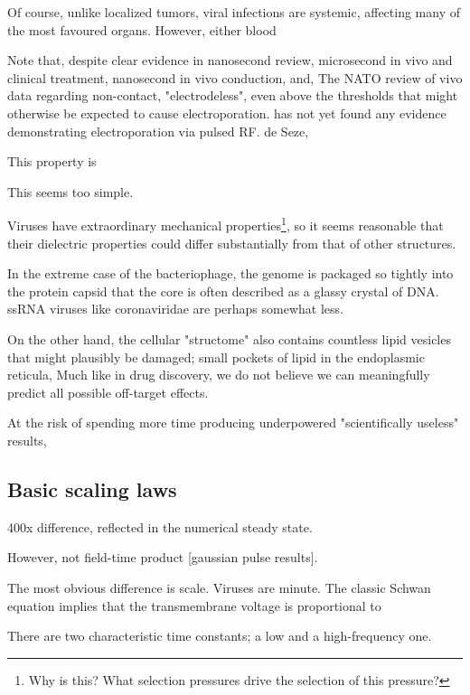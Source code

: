 \documentclass[fleqn,10pt]{paper}
\begin{document}
Of course, unlike localized tumors, viral infections are systemic, affecting many of the most favoured organs. However, either blood 



Note that, despite clear evidence in nanosecond review, microsecond in vivo and clinical treatment, nanosecond in vivo conduction, and, The NATO review of vivo data regarding non-contact, "electrodeless", even above the thresholds that might otherwise be expected to cause electroporation. has not yet found any evidence demonstrating electroporation via pulsed RF. de Seze, 

This property is 
\cite{Nanosecond2006b} 



This seems too simple.

Viruses have extraordinary mechanical properties\footnote{Why is this? What selection pressures drive the selection of this pressure?}, so it seems reasonable that their dielectric properties could differ substantially from that of other structures. 

In the extreme case of the bacteriophage, the genome is packaged so tightly into the protein capsid that the core is often described as a glassy crystal of DNA\cite{Conformation2007}. ssRNA viruses like coronaviridae are perhaps somewhat less. 

On the other hand, the cellular "structome" also contains countless lipid vesicles that might plausibly be damaged; small pockets of lipid in the endoplasmic reticula, Much like in drug discovery, we do not believe we can meaningfully predict all possible off-target effects.



At the risk of spending more time producing underpowered "scientifically useless" results, 

\subsection*{Basic scaling laws}

400x difference, reflected in the numerical steady state.

However, not field-time product [gaussian pulse results]. 

The most obvious difference is scale. Viruses are minute. The classic Schwan equation implies that the transmembrane voltage is proportional to 

There are two characteristic time constants; a low and a high-frequency one.
\end{document}

